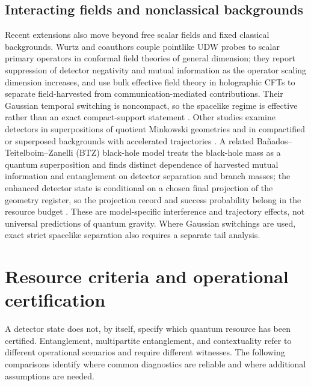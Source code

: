 \documentclass[pdflatex,sn-mathphys-num]{sn-jnl}
\begin{document}
\subsection{Interacting fields and nonclassical backgrounds}
Recent extensions also move beyond free scalar fields and fixed classical backgrounds. Wurtz and coauthors couple pointlike UDW probes to scalar primary operators in conformal field theories of general dimension; they report suppression of detector negativity and mutual information as the operator scaling dimension increases, and use bulk effective field theory in holographic CFTs to separate field-harvested from communication-mediated contributions. Their Gaussian temporal switching is noncompact, so the spacelike regime is effective rather than an exact compact-support statement \cite{WurtzLimaMyersMartinez2026}. Other studies examine detectors in superpositions of quotient Minkowski geometries and in compactified or superposed backgrounds with accelerated trajectories \cite{ChakrabortyHacklZych2025,PoopathysankarHacklChakraborty2026}. A related Bañados--Teitelboim--Zanelli (BTZ) black-hole model treats the black-hole mass as a quantum superposition and finds distinct dependence of harvested mutual information and entanglement on detector separation and branch masses; the enhanced detector state is conditional on a chosen final projection of the geometry register, so the projection record and success probability belong in the resource budget \cite{TangLiuLiuWang2026}. These are model-specific interference and trajectory effects, not universal predictions of quantum gravity. Where Gaussian switchings are used, exact strict spacelike separation also requires a separate tail analysis.

\section{Resource criteria and operational certification}
\label{sec:resources}
A detector state does not, by itself, specify which quantum resource has been certified. Entanglement, multipartite entanglement, and contextuality refer to different operational scenarios and require different witnesses. The following comparisons identify where common diagnostics are reliable and where additional assumptions are needed.
\end{document}
